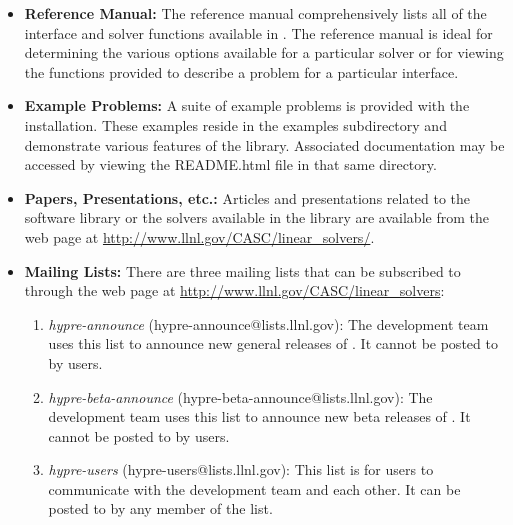 \begin{itemize}

\item
{\bf Reference Manual:} The reference manual comprehensively lists all
of the interface and solver functions available in \hypre{}.  The
reference manual is ideal for determining the various options
available for a particular solver or for viewing the functions
provided to describe a problem for a particular interface. 

\item{\bf Example Problems:} A suite of example problems is provided
with the \hypre{} installation.  These examples reside in the examples
subdirectory and demonstrate various features of the \hypre{} library.
Associated documentation may be accessed by viewing the README.html
file in that same directory.

\item
{\bf Papers, Presentations, etc.:} Articles and presentations related to the
\hypre{} software library or the solvers available
in the library are available from the \hypre{} web page at
\url{http://www.llnl.gov/CASC/linear_solvers/}.

\item{\bf Mailing Lists:} There are three \hypre{} mailing lists that can be subscribed to through the
\hypre{} web page at \url{http://www.llnl.gov/CASC/linear_solvers}:

\begin{enumerate}
\item {\sl hypre-announce} (hypre-announce@lists.llnl.gov): The development team
uses this list to announce new general releases of \hypre{}.  It cannot be
posted to by users.

\item {\sl hypre-beta-announce} (hypre-beta-announce@lists.llnl.gov): The
development team uses this list to announce new beta releases of \hypre{}.  It
cannot be posted to by users.

\item {\sl hypre-users} (hypre-users@lists.llnl.gov): This list is for \hypre{}
users to communicate with the development team and each other.  It can be
posted to by any member of the list.
\end{enumerate}



\end{itemize}


